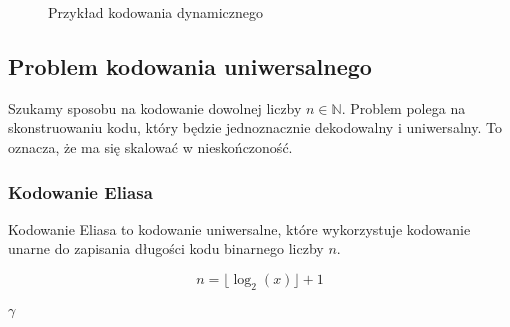 \documentclass{../notatki}
\begin{document}
\begin{figure}[H]
  \centering
  \caption{Przykład kodowania dynamicznego}
\end{figure}

\subsection{Problem kodowania uniwersalnego}

Szukamy sposobu na kodowanie dowolnej liczby $n \in \mathbb{N}$. Problem polega
na skonstruowaniu kodu, który będzie jednoznacznie dekodowalny i uniwersalny.
To oznacza, że ma się skalować w nieskończoność.

\subsubsection{Kodowanie Eliasa}

Kodowanie Eliasa to kodowanie uniwersalne, które wykorzystuje kodowanie unarne
do zapisania długości kodu binarnego liczby $n$.

$$
n = \lfloor \log_2(x) \rfloor + 1
$$

\paragraph{$\gamma$}
\end{document}

